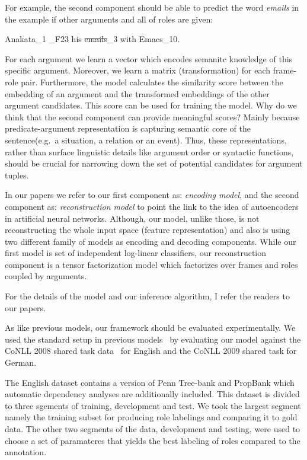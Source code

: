For example, the second component should be able to predict the word
\emph{emails} in the example if other arguments and all of roles are given:

\begin{center}
\lbrack Anakata\rbrack_{1}  
    \rbrack_{F23} his \lbrack
    \st{emails}\rbrack_{3} with \lbrack
    Emacs\rbrack_{10}.
\end{center}

For each argument we learn a vector which encodes semanitc knowledge of this
specific argument. Moreover, we learn a matrix (transformation) for each
frame-role pair. Furthermore, the model calculates the similarity score between
the embedding of an argument and the transformed embeddings of the other argument candidates. This score can
be used for training the model. Why do we think that the second component can
provide meaningful scores? Mainly because predicate-argument representation is
capturing semantic core of the sentence(e.g.\ a situation, a relation or an
event).
Thus, these representations, rather than surface linguistic details like argument order or syntactic functions, 
should be crucial for narrowing down the set of potential candidates for
argument tuples.

In our papers we refer to our first component as: \emph{encoding
model}, and the second component as: \emph{reconstruction model} to point the
link to the idea of autoencoders in artificial neural networks. Although, our model, unlike
those, is not reconstructing the whole input space (feature representation) and
also is using two different family of models as encoding and decoding
components.
While our first model is set of independent log-linear classifiers, our reconstruction
component is a tensor factorization model which factorizes over frames and roles
coupled by arguments. 

For the details of the model and our inference algorithm, I refer the readers to
our papers. 

As like previous models, our framework should be evaluated experimentally. We
used the standard setup in previous models~\citep{Lang10} by evaluating our
model against the CoNLL 2008 shared task data~\citep{conll08} for English and
the CoNLL 2009 shared task for German.

The English dataset contains a version of Penn Tree-bank and PropBank which
automatic dependency analyses are additionally included. This dataset is divided
to three sgements of training, development and test. We took the largest
segment namely the training subset for producing role labelings and comparing it
to gold data. The other two segments of the data, development and testing, were
used to choose a set of paramateres that yields the best
labeling of roles compared to the annotation. 

